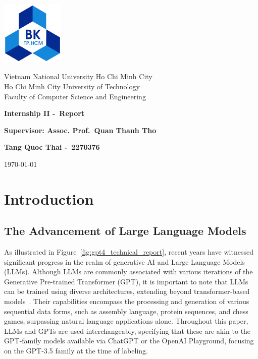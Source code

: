 \documentclass[12pt]{extarticle}
\author{}
\newcommand{\schoolname}{Vietnam National University Ho Chi Minh City \\ Ho Chi Minh City University of Technology \\ Faculty of Computer Science and Engineering}
\newcommand{\schoollogo}{\includegraphics[width=3cm]{img/hcmut.png}}
\begin{document}
\begin{titlepage}
    \centering
    \vspace*{2cm}
    \schoollogo\par
    \vspace{1cm}
    {\Large \schoolname\par}
    \vspace{3cm}
    {\huge\bfseries Internship II -\ Report \par}
    \vspace{1cm}
    {\Large\bfseries Supervisor: Assoc. Prof.\ Quan Thanh Tho \par}
    \vspace{1cm}
    {\large \bfseries Tang Quoc Thai -\ 2270376\par}
    \vfill
    {\large \today\par}
\end{titlepage}

\tableofcontents
\newpage

\section{Introduction}

\subsection{The Advancement of Large Language Models}
As illustrated in Figure~\ref{fig:gpt4_technical_report}, recent years have witnessed significant progress in the realm of generative AI and Large Language Models (LLMs). Although LLMs are commonly associated with various iterations of the Generative Pre-trained Transformer (GPT), it is important to note that LLMs can be trained using diverse architectures, extending beyond transformer-based models~\cite{devlin2019bert}. Their capabilities encompass the processing and generation of various sequential data forms, such as assembly language, protein sequences, and chess games, surpassing natural language applications alone. Throughout this paper, LLMs and GPTs are used interchangeably, specifying that these are akin to the GPT-family models available via ChatGPT or the OpenAI Playground, focusing on the GPT-3.5 family at the time of labeling.
\end{document}
